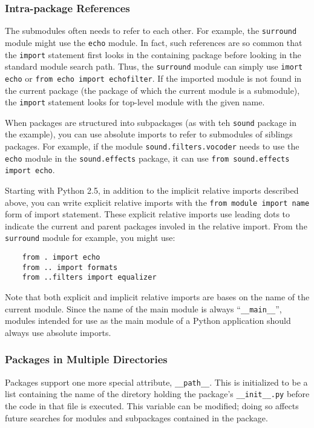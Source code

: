 \documentclass[UTF8]{article}
\begin{document}
\subsubsection{Intra-package References}
The submodules often needs to refer to each other. For example, the \texttt{surround} module might
use the \texttt{echo} module. In fact, such references are so common that the \texttt{import}
statement first looks in the containing package before looking in the standard module search path.
Thus, the \texttt{surround} module can simply use \texttt{imort echo} or
\texttt{from echo import echofilter}. If the imported module is not found in the current
package (the package of which the current module is a submodule), the \texttt{import} statement
looks for top-level module with the given name.

When packages are structured into subpackages (as with teh \texttt{sound} package in the example),
you can use absolute imports to refer to submodules of siblings packages. For example, if the
module \texttt{sound.filters.vocoder} needs to use the \texttt{echo} module in the
\texttt{sound.effects} package, it can use \texttt{from sound.effects import echo}.

Starting with Python 2.5, in addition to the implicit relative imports described above, you can
write explicit relative imports with the \texttt{from module import name} form of
import statement. These explicit relative imports use leading dots to indicate the current and
parent packages involed in the relative import. From the \texttt{surround} module for example, you
might use:
\begin{verbatim}
    from . import echo
    from .. import formats
    from ..filters import equalizer
\end{verbatim}

Note that both explicit and implicit relative imports are bases on the name of the current module.
Since the name of the main module is always ``\texttt{\_\_main\_\_}'', modules intended for use as
the main module of a Python application should always use absolute imports.

\subsubsection{Packages in Multiple Directories}
Packages support one more special attribute, \texttt{\_\_path\_\_}. This is initialized to be a
list containing the name of the diretory holding the package's \texttt{\_\_init\_\_.py} before the
code in that file is executed. This variable can be modified; doing so affects future searches for
modules and subpackages contained in the package.
\end{document}
